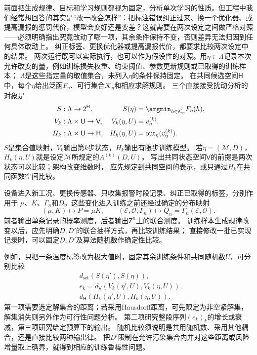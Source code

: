 前面把生成规律、目标和学习规则都视为固定，分析单次学习的性质。但工程中我们经常想回答的其实是“改一改会怎样”：把标注错误纠正过来、换一个优化器、或提高漏报的惩罚代价，模型会变好还是变差？这就需要在两次设定之间做严格对照——必须明确指出究竟改动了哪一项，其余条件保持不变，否则差异无法归因到任何具体改动上。
纠正标签、更换优化器或提高漏报代价，都要求比较两次设定中的结果。
两次运行既可以实际执行，也可以作为假设性的对照。用$\eta\in\Lambda$记录本次
允许改变的量，例如训练损失权重、约束阈值、参数更新规则或已取得的训练样本；
$\Lambda$是这些指定量的取值集合，未列入$\eta$的条件保持固定。
在共同候选空间$\mathsf H$中，每个$\eta$给出泛函$F_\eta$、可行集合$\mathcal K_\eta$和相应求解规则。
三个直接接受扰动分析的对象是
\begin{equation}
  \begin{aligned}
    S&:\Lambda\to2^{\mathsf H},
      &S(\eta)&=\argmin_{h\in\mathcal K_\eta}F_\eta(h),\\
    V_k&:\Lambda\times\mathsf U\to\mathsf V,
      &V_k(\eta,U)&=v_\eta^{(k)},\\
    H_k&:\Lambda\times\mathsf U\to\mathsf H,
      &H_k(\eta,U)&=\operatorname{out}_\eta(v_\eta^{(k)}).
  \end{aligned}
  \label{eq:future-task-configuration-response-maps}
\end{equation}
$S$是集合值映射，$V_k$输出第$k$步状态，$H_k$输出有限步训练模型。
若$\eta=(\mathcal M,D)$，$H_k(\eta,U)$就是设定$\mathcal M$所规定的$A^{(k)}(D,U)$。
写出共同状态空间$\mathsf V$的前提是两次状态可以比较；架构改变维数时，
应先规定到共同空间的表示，或只通过$H_k$在共同函数空间比较。

设备进入新工况、更换传感器、只收集报警时段记录、纠正已取得的标签，分别作用于
$\mu$、$K$、$\Gamma_n$和$D$。这些变化进入训练之前还经过确定的分布映射
\[
  (\mu,K)\mapsto P=\mu K,\qquad
  (\mathcal E,\mathcal O,\Gamma_n)\mapsto
       Q_n=\Gamma_n(\mathcal E,\mathcal O).
\]
前者输出单条记录的概率测度，后者输出$\mathsf Z^n$上的联合测度。
训练样本生成规律改变以后，应先明确$D,D'$的联合抽样方式，再比较训练结果；
直接修改一批已实现记录时，可以固定$D,D'$及算法随机数作确定性比较。


例如，只把一条温度标签改为极大值时，固定其余训练条件和共同随机数$U$，可分别比较
\[
  \begin{aligned}
    &d_{\mathrm{set}}(S(\eta'),S(\eta)),\\
    &e_k=d_{\mathsf V}(V_k(\eta',U),V_k(\eta,U)),\\
    &d_{\mathsf H}(H_k(\eta',U),H_k(\eta,U)).
  \end{aligned}
\]
第一项需要选定解集合的距离；若采用Hausdorff距离，可先限定为非空紧解集，
解集消失则另外作为可行性问题分析。
第二项研究整段序列$(e_k)_k$的增长或衰减，第三项研究给定预算下的输出。
随机比较须说明是共用随机数、采用其他耦合，还是直接比较两种输出律。
把$D'$限制在允许污染集合内并对这些距离或风险增量取上确界，就得到相应的训练鲁棒性问题。

